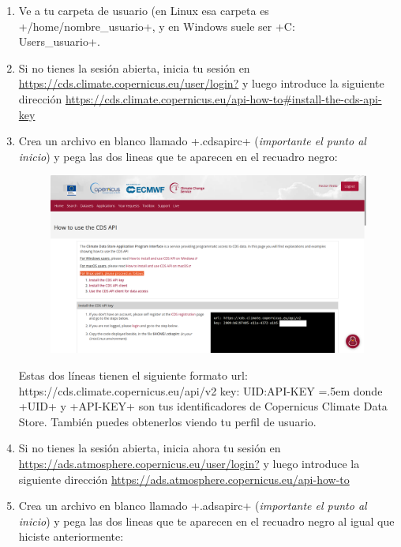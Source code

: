 \documentclass[a4paper,11pt]{article}
\newenvironment{cverbatim}
 {\SaveVerbatim{cverb}}
 {\endSaveVerbatim
  \flushleft\fboxrule=0pt\fboxsep=.5em
  \colorbox{bg}{\BUseVerbatim{cverb}}%
  \endflushleft
}
\begin{document}
\begin{enumerate}
  \item Ve a tu carpeta de usuario (en Linux esa carpeta es \cverb+/home/nombre_usuario+, y en Windows suele ser \cverb+C:\\Users\nombre_usuario+.
  
  \item Si no tienes la sesión abierta, inicia tu sesión en \url{https://cds.climate.copernicus.eu/user/login?} y luego introduce la siguiente dirección \url{https://cds.climate.copernicus.eu/api-how-to\#install-the-cds-api-key}
  
  \item Crea un archivo en blanco llamado \cverb+.cdsapirc+ (\emph{importante el punto al inicio}) y pega las dos lineas que te aparecen en el recuadro negro:
  \begin{figure}[H]\centering
    \includegraphics[width=\textwidth]{cds_key}
  \end{figure}
  
  Estas dos líneas tienen el siguiente formato
  \begin{cverbatim}
   url: https://cds.climate.copernicus.eu/api/v2
   key: UID:API-KEY
  \end{cverbatim}
  donde \cverb+UID+ y \cverb+API-KEY+ son tus identificadores de Copernicus Climate Data Store. También puedes obtenerlos viendo tu perfil de usuario.

  \item Si no tienes la sesión abierta, inicia ahora tu sesión en \url{https://ads.atmosphere.copernicus.eu/user/login?} y luego introduce la siguiente dirección \url{https://ads.atmosphere.copernicus.eu/api-how-to}
  
  \item Crea un archivo en blanco llamado \cverb+.adsapirc+ (\emph{importante el punto al inicio}) y pega las dos lineas que te aparecen en el recuadro negro al igual que hiciste anteriormente:
  

\end{enumerate}
\end{document}
